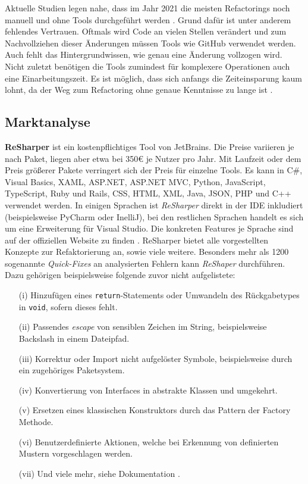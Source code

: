 Aktuelle Studien legen nahe, dass im Jahr 2021 die meisten Refactorings noch manuell und ohne Tools durchgeführt werden \cite{EilertsenMurphy2021}. Grund dafür ist unter anderem fehlendes Vertrauen. Oftmals wird Code an vielen Stellen verändert und zum Nachvollziehen dieser Änderungen müssen Tools wie GitHub verwendet werden. Auch fehlt das Hintergrundwissen, wie genau eine Änderung vollzogen wird. Nicht zuletzt benötigen die Tools zumindest für komplexere Operationen auch eine Einarbeitungszeit. Es ist möglich, dass sich anfangs die Zeiteinsparung kaum lohnt, da der Weg zum Refactoring ohne genaue Kenntnisse zu lange ist \cite{EilertsenMurphy2021}.

\subsection{Marktanalyse}
\label{subsec:Refactoring_analyse}
\textbf{ReSharper} ist ein kostenpflichtiges Tool von JetBrains. Die Preise variieren je nach Paket, liegen aber etwa bei 350€ je Nutzer pro Jahr. Mit Laufzeit oder dem Preis größerer Pakete verringert sich der Preis für einzelne Tools. Es kann in C\#, Visual Basics, XAML, ASP.NET, ASP.NET MVC, Python, JavaScript, TypeScript, Ruby und Rails, CSS, HTML, XML, Java, JSON, PHP und C++ verwendet werden. In einigen Sprachen ist \textit{ReSharper} direkt in der IDE inkludiert (beispielsweise PyCharm oder InelliJ), bei den restlichen Sprachen handelt es sich um eine Erweiterung für Visual Studio. Die konkreten Features je Sprache sind auf der offiziellen Website zu finden \cite{ReShaperOverviewLanguages}. ReSharper bietet alle vorgestellten Konzepte zur Refaktorierung an, sowie viele weitere. Besonders mehr als 1200 sogenannte \textit{Quick-Fixes} an analysierten Fehlern kann \textit{ReShaper} durchführen. Dazu gehörigen beispielsweise folgende zuvor nicht aufgelistete: 
\begin{itemize}
	\item[(i)] Hinzufügen eines \lstinline|return|-Statements oder Umwandeln des Rückgabetypes in \lstinline|void|, sofern dieses fehlt.
	\item[(ii)] Passendes \textit{escape} von sensiblen Zeichen im String, beispielsweise Backslash in einem Dateipfad.
	\item[(iii)] Korrektur oder Import nicht aufgelöster Symbole, beispielsweise durch ein zugehöriges Paketsystem.
	\item[(iv)] Konvertierung von Interfaces in abstrakte Klassen und umgekehrt. 
	\item[(v)] Ersetzen eines klassischen Konstruktors durch das Pattern der Factory Methode. 
	\item[(vi)] Benutzerdefinierte Aktionen, welche bei Erkennung von definierten Mustern vorgeschlagen werden.
	\item[(vii)] Und viele mehr, siehe Dokumentation \cite{ReShaperFunctions}.
\end{itemize}
